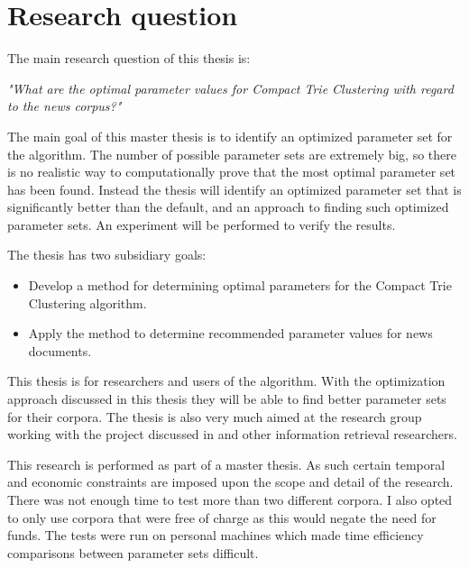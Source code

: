 \section{Research question}
The main research question of this thesis is:

\emph{"What are the optimal parameter values for Compact Trie Clustering with regard to the news corpus?"}

The main goal of this master thesis is to identify an optimized parameter set for the \CTC algorithm. The number of possible parameter sets are extremely big, so there is no realistic way to computationally prove that the most optimal parameter set has been found. Instead the thesis will identify an optimized parameter set that is significantly better than the default, and an approach to finding such optimized parameter sets. An experiment will be performed to verify the results.

The thesis has two subsidiary goals:
\begin{itemize}
	\item Develop a method for determining optimal parameters for the Compact Trie Clustering algorithm.
	\item Apply the method to determine recommended parameter values for news documents.
\end{itemize}

This thesis is for researchers and users of the \STC algorithm. With the optimization approach discussed in this thesis they will be able to find better parameter sets for their corpora. The thesis is also very much aimed at the research group working with the project discussed in  and other information retrieval researchers.

This research is performed as part of a master thesis. As such certain temporal and economic constraints are imposed upon the scope and detail of the research. There was not enough time to test more than two different corpora. I also opted to only use corpora that were free of charge as this would negate the need for funds. The tests were run on personal machines which made time efficiency comparisons between parameter sets difficult.